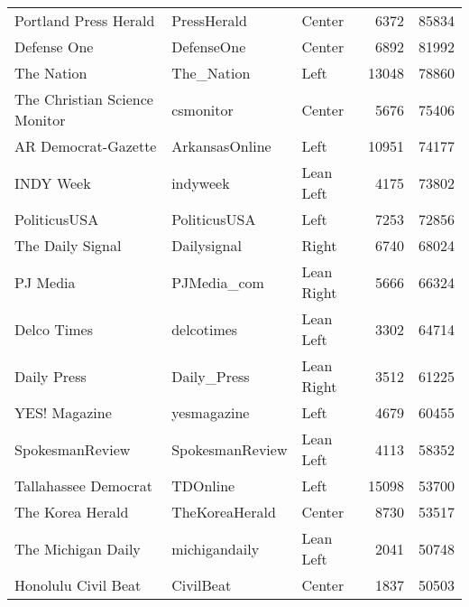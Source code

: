 \begin{center}
\begin{longtable}{lllrr}
                    Portland Press Herald &      PressHerald &        Center &              6372 &      85834 \\
                              Defense One &       DefenseOne &        Center &              6892 &      81992 \\
                               The Nation &       The\_Nation &          Left &             13048 &      78860 \\
            The Christian Science Monitor &        csmonitor &        Center &              5676 &      75406 \\
                      AR Democrat-Gazette &   ArkansasOnline &          Left &             10951 &      74177 \\
                                INDY Week &         indyweek &     Lean Left &              4175 &      73802 \\
                             PoliticusUSA &     PoliticusUSA &          Left &              7253 &      72856 \\
                         The Daily Signal &      Dailysignal &         Right &              6740 &      68024 \\
                                 PJ Media &      PJMedia\_com &    Lean Right &              5666 &      66324 \\
                              Delco Times &       delcotimes &     Lean Left &              3302 &      64714 \\
                              Daily Press &      Daily\_Press &    Lean Right &              3512 &      61225 \\
                            YES! Magazine &      yesmagazine &          Left &              4679 &      60455 \\
                          SpokesmanReview &  SpokesmanReview &     Lean Left &              4113 &      58352 \\
                     Tallahassee Democrat &         TDOnline &          Left &             15098 &      53700 \\
                         The Korea Herald &   TheKoreaHerald &        Center &              8730 &      53517 \\
                       The Michigan Daily &    michigandaily &     Lean Left &              2041 &      50748 \\
                      Honolulu Civil Beat &        CivilBeat &        Center &              1837 &      50503 \\

\end{longtable}
\end{center}

